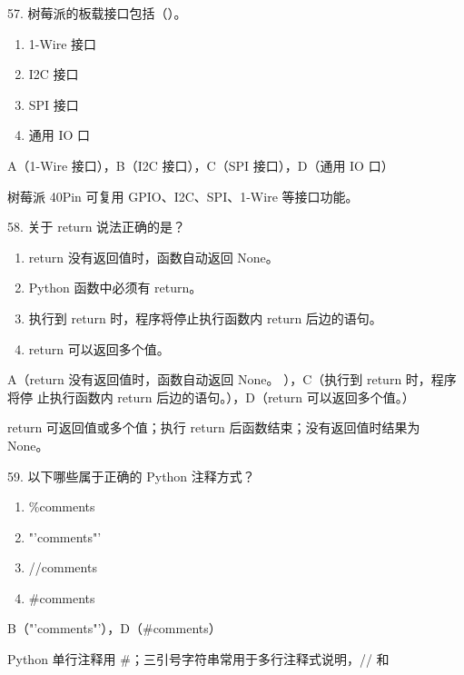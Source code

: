 \begin{question}{57. 树莓派的板载接口包括（）。}
\begin{enumerate}[label=\Alph*., leftmargin=2.4em, itemsep=0.2em]
\item 1-Wire 接口
\item I2C 接口
\item SPI 接口
\item 通用 IO 口
\end{enumerate}
\end{question}
\begin{answer}
A（1-Wire 接口），B（I2C 接口），C（SPI 接口），D（通用 IO 口）
\end{answer}
\begin{explanation}
树莓派 40Pin 可复用 GPIO、I2C、SPI、1-Wire 等接口功能。
\end{explanation}

\begin{question}{58. 关于 return 说法正确的是？}
\begin{enumerate}[label=\Alph*., leftmargin=2.4em, itemsep=0.2em]
\item return 没有返回值时，函数自动返回 None。
\item Python 函数中必须有 return。
\item 执行到 return 时，程序将停止执行函数内 return 后边的语句。
\item return 可以返回多个值。
\end{enumerate}
\end{question}
\begin{answer}
A（return 没有返回值时，函数自动返回 None。 ），C（执行到 return 时，程序将停 止执行函数内 return 后边的语句。），D（return 可以返回多个值。）
\end{answer}
\begin{explanation}
return 可返回值或多个值；执行 return 后函数结束；没有返回值时结果为 None。
\end{explanation}

\begin{question}{59. 以下哪些属于正确的 Python 注释方式？}
\begin{enumerate}[label=\Alph*., leftmargin=2.4em, itemsep=0.2em]
\item \%comments
\item "'comments"'
\item //comments
\item \#comments
\end{enumerate}
\end{question}
\begin{answer}
B（"'comments"'），D（\#comments）
\end{answer}
\begin{explanation}
Python 单行注释用 #；三引号字符串常用于多行注释式说明，// 和 %
\end{explanation}

